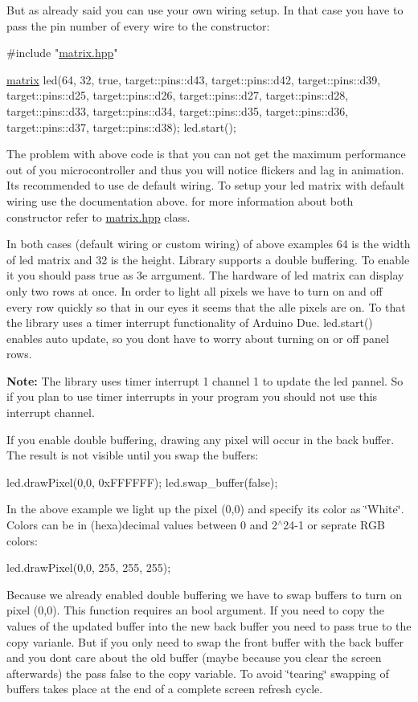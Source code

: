 But as already said you can use your own wiring setup. In that case you have to pass the pin number of every wire to the constructor\+: 
\begin{DoxyCode}
\textcolor{preprocessor}{#include "\hyperlink{matrix_8hpp}{matrix.hpp}"}

    \hyperlink{classmatrix}{matrix} led(64, 32, \textcolor{keyword}{true}, target::pins::d43, target::pins::d42, target::pins::d39,
            target::pins::d25, target::pins::d26, target::pins::d27, target::pins::d28,
            target::pins::d33, target::pins::d34, target::pins::d35, target::pins::d36,
            target::pins::d37, target::pins::d38);
    led.start();
\end{DoxyCode}
 The problem with above code is that you can not get the maximum performance out of you microcontroller and thus you will notice flickers and lag in animation. It\textquotesingle{}s recommended to use de default wiring. To setup your led matrix with default wiring use the documentation above. for more information about both constructor refer to \hyperlink{matrix_8hpp}{matrix.\+hpp} class.

In both cases (default wiring or custom wiring) of above examples 64 is the width of led matrix and 32 is the height. Library supports a double buffering. To enable it you should pass true as 3e arrgument. The hardware of led matrix can display only two rows at once. In order to light all pixels we have to turn on and off every row quickly so that in our eyes it seems that the alle pixels are on. To that the library uses a timer interrupt functionality of Arduino Due. led.\+start() enables auto update, so you don\textquotesingle{}t have to worry about turning on or off panel rows.

{\bfseries  Note\+: } The library uses timer interrupt 1 channel 1 to update the led pannel. So if you plan to use timer interrupts in your program you should not use this interrupt channel.

If you enable double buffering, drawing any pixel will occur in the back buffer. The result is not visible until you swap the buffers\+: 
\begin{DoxyCode}
led.drawPixel(0,0, 0xFFFFFF);
led.swap\_buffer(\textcolor{keyword}{false});
\end{DoxyCode}
 In the above example we light up the pixel (0,0) and specify it\textquotesingle{}s color as \char`\"{}\+White\char`\"{}. Colors can be in (hexa)decimal values between 0 and 2$^\wedge$24-\/1 or seprate R\+GB colors\+: 
\begin{DoxyCode}
led.drawPixel(0,0, 255, 255, 255);
\end{DoxyCode}
 Because we already enabled double buffering we have to swap buffers to turn on pixel (0,0). This function requires an bool argument. If you need to copy the values of the updated buffer into the new back buffer you need to pass true to the copy varianle. But if you only need to swap the front buffer with the back buffer and you don\textquotesingle{}t care about the old buffer (maybe because you clear the screen afterwards) the pass false to the copy variable. To avoid \char`\"{}tearing\char`\"{} swapping of buffers takes place at the end of a complete screen refresh cycle.


